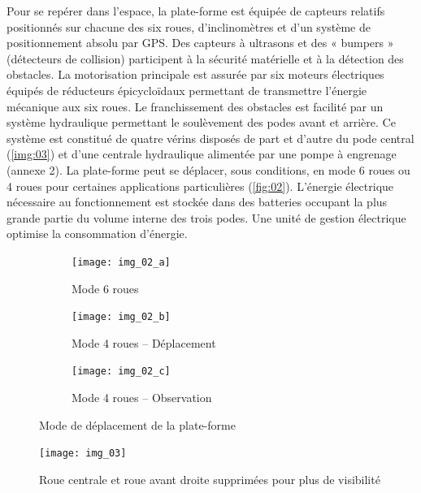 Pour se repérer dans l’espace, la plate-forme est équipée de capteurs relatifs positionnés sur chacune des six roues, d’inclinomètres et d’un système de positionnement absolu par GPS. Des capteurs à ultrasons et des « bumpers » (détecteurs de collision) participent à la sécurité matérielle et à la détection des obstacles.
La motorisation principale est assurée par six moteurs électriques équipés de réducteurs épicycloïdaux permettant de transmettre l’énergie mécanique aux six roues. Le franchissement des obstacles est facilité par un système hydraulique permettant le soulèvement des podes avant et arrière. Ce système est constitué de quatre vérins disposés de part et d’autre du pode central (\autoref{img:03}) et d’une centrale hydraulique alimentée par une pompe à engrenage (annexe 2). La plate-forme peut se déplacer, sous conditions, en mode 6 roues ou 4 roues pour certaines applications particulières (\autoref{fig:02}). L’énergie électrique nécessaire au fonctionnement est stockée dans des batteries occupant la plus grande partie du volume interne des trois podes. Une unité de gestion électrique optimise la consommation d’énergie. 

\begin{figure}[H]
\centering
\begin{subfigure}{0.27\textwidth}
    \texttt{[image: img\_02\_a]}
    \caption{Mode 6 roues}
    \label{fig:02a}
\end{subfigure} \hfill
\begin{subfigure}{0.27\textwidth}
    \texttt{[image: img\_02\_b]}
    \caption{Mode 4 roues -- Déplacement}
    \label{fig:02a}
\end{subfigure} \hfill
\begin{subfigure}{0.27\textwidth}
    \texttt{[image: img\_02\_c]}
    \caption{Mode 4 roues -- Observation}
    \label{fig:02a}
\end{subfigure}\caption{Mode de déplacement de la plate-forme \label{fig:02}}
\end{figure}


\begin{figure}[H]
\centering
\texttt{[image: img\_03]}
\caption{Roue centrale et roue avant droite supprimées pour plus de visibilité \label{img:03}}
\end{figure}

